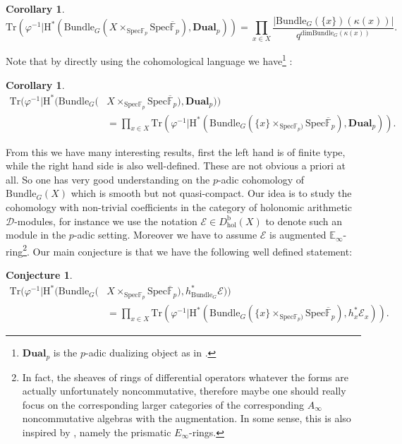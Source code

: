 \documentclass[11pt]{book}
\newtheorem{corollary}[theorem]{Corollary}
\newtheorem{conjecture}[theorem]{Conjecture}
\theoremstyle{definition}
\numberwithin{equation}{section}
\begin{document}
\begin{corollary}
\begin{displaymath}
\mathrm{Tr}(\varphi^{-1}|\mathrm{H}^*(\mathrm{Bundle}_G(X\times_{\mathrm{Spec}\mathbb{F}_p} \mathrm{Spec}\overline{\mathbb{F}}_p),\mathbf{Dual}_p))=\prod_{x\in X} \frac{|\mathrm{Bundle}_G(\{x\})(\kappa(x))|}{q^{\mathrm{dim}\mathrm{Bundle}_G(\kappa(x))}}.	
\end{displaymath}	
\end{corollary}


Note that by directly using the cohomological language we have\footnote{$\mathbf{Dual}_p$ is the $p$-adic dualizing object as in \cite[Section 1.1.4, and above 2.2.23]{Abe1}.} :

\begin{corollary}
\begin{align}
\mathrm{Tr}(\varphi^{-1}|\mathrm{H}^*(\mathrm{Bundle}_G(&X\times_{\mathrm{Spec}\mathbb{F}_p} \mathrm{Spec}\overline{\mathbb{F}}_p),\mathbf{Dual}_p))\\
&=\prod_{x\in X} \mathrm{Tr}(\varphi^{-1}|\mathrm{H}^*(\mathrm{Bundle}_G(\{x\}\times_{\mathrm{Spec}\mathbb{F}_p)} \mathrm{Spec}\overline{\mathbb{F}}_p),\mathbf{Dual}_p)).
\end{align}
\end{corollary}

From this we have many interesting results, first the left hand is of finite type, while the right hand side is also well-defined. These are not obvious a priori at all. So one has very good understanding on the $p$-adic cohomology of $\mathrm{Bundle}_G(X)$ which is smooth but not quasi-compact. Our idea is to study the cohomology with non-trivial coefficients in the category of holonomic arithmetic $\mathcal{D}$-modules, for instance we use the notation $\mathcal{E}\in D^\mathrm{b}_{\mathrm{hol}}(X)$ to denote such an module in the $p$-adic setting. Moreover we have to assume $\mathcal{E}$ is augmented $\mathbb{E}_\infty$-ring\footnote{In fact, the sheaves of rings of differential operators whatever the forms are actually unfortunately noncommutative, therefore maybe one should really focus on the corresponding larger categories of the corresponding $A_\infty$ noncommutative algebras with the augmentation. In some sense, this is also inspired by \cite{BS}, namely the prismatic $E_\infty$-rings.}. Our main conjecture is that we have the following well defined statement:

\begin{conjecture}
\begin{align}
\mathrm{Tr}(\varphi^{-1}|\mathrm{H}^*(\mathrm{Bundle}_G(&X\times_{\mathrm{Spec}\mathbb{F}_p} \mathrm{Spec}\overline{\mathbb{F}}_p),h_{\mathrm{Bundle}_G}^*\mathcal{E}))\\
&=\prod_{x\in X} \mathrm{Tr}(\varphi^{-1}|\mathrm{H}^*(\mathrm{Bundle}_G(\{x\}\times_{\mathrm{Spec}\mathbb{F}_p)} \mathrm{Spec}\overline{\mathbb{F}}_p),h_x^*{\mathcal{E}}_x)).	
\end{align}
\end{conjecture}
\end{document}

